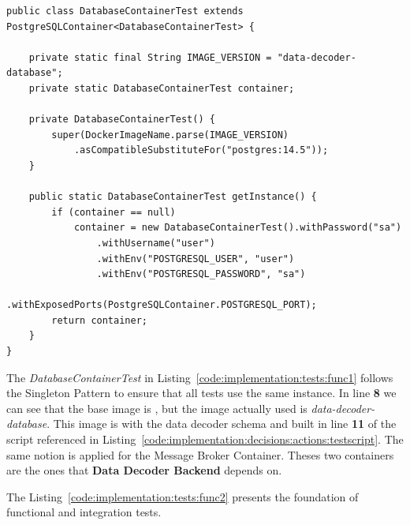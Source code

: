 \begin{lstlisting}[style=Java, caption=Functional Test - Message Broker - Data Decoder Backend Setup, label={code:implementation:tests:func1}]
public class DatabaseContainerTest extends PostgreSQLContainer<DatabaseContainerTest> {

    private static final String IMAGE_VERSION = "data-decoder-database";
    private static DatabaseContainerTest container;

    private DatabaseContainerTest() {
        super(DockerImageName.parse(IMAGE_VERSION)
            .asCompatibleSubstituteFor("postgres:14.5"));
    }

    public static DatabaseContainerTest getInstance() {
        if (container == null)
            container = new DatabaseContainerTest().withPassword("sa")
                .withUsername("user")
                .withEnv("POSTGRESQL_USER", "user")
                .withEnv("POSTGRESQL_PASSWORD", "sa")
                .withExposedPorts(PostgreSQLContainer.POSTGRESQL_PORT);
        return container;
    }
}
\end{lstlisting}

The \textit{DatabaseContainerTest} in Listing~\ref{code:implementation:tests:func1} follows the Singleton Pattern to ensure that all tests use the same instance. In line \textbf{8} we can see that the base image is , but the image actually used is \textit{data-decoder-database}. This image is  with the data decoder schema and built in line \textbf{11} of the script referenced in Listing~\ref{code:implementation:decisions:actions:testscript}. The same notion is applied for the Message Broker Container. Theses two containers are the ones that \textbf{Data Decoder Backend} depends on.

The Listing~\ref{code:implementation:tests:func2} presents the foundation of functional and integration tests.

